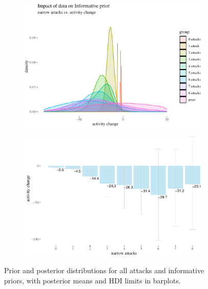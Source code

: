 \documentclass[10pt,]{scrartcl}
\begin{document}
\begin{figure}[!ht]
\begin{subfigure}[!ht]{0.9\textwidth}

\begin{center}\includegraphics[width=1\linewidth]{redditAnalysisWalkthrough_files/figure-latex/unnamed-chunk-61-1} \end{center}
\end{subfigure} 


\begin{subfigure}[!ht]{0.9\textwidth}

\begin{center}\includegraphics[width=1\linewidth]{redditAnalysisWalkthrough_files/figure-latex/unnamed-chunk-62-1} \end{center}
\end{subfigure}

\caption{Prior and posterior distributions for all attacks and informative priors, with posterior means and HDI limits in barplots.}
\label{fig:bayesian3}
\end{figure}
\end{document}
